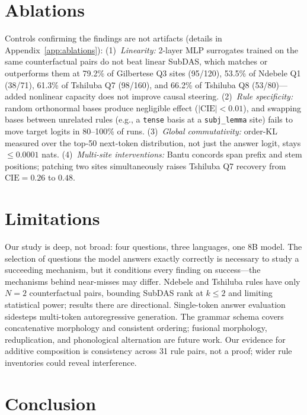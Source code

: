 \documentclass{article}
\begin{document}
\section{Ablations}
\label{sec:ablations}

Controls confirming the findings are not artifacts (details in
Appendix~\ref{app:ablations}): (1)~\emph{Linearity:} 2-layer MLP surrogates
trained on the same counterfactual pairs do not beat linear SubDAS, which
matches or outperforms them at 79.2\% of Gilbertese Q3 sites (95/120), 53.5\%
of Ndebele Q1 (38/71), 61.3\% of Tshiluba Q7 (98/160), and 66.2\% of Tshiluba
Q8 (53/80)---added nonlinear capacity does not improve causal steering.
(2)~\emph{Rule specificity:} random orthonormal bases produce negligible
effect ($|\mathrm{CIE}| < 0.01$), and swapping bases between unrelated rules
(e.g., a \texttt{tense} basis at a \texttt{subj\_lemma} site) fails to move
target logits in 80--100\% of runs. (3)~\emph{Global commutativity:} order-KL
measured over the top-50 next-token distribution, not just the answer logit,
stays $\le 0.0001$ nats. (4)~\emph{Multi-site interventions:} Bantu concords
span prefix and stem positions; patching two sites simultaneously raises
Tshiluba Q7 recovery from $\mathrm{CIE}=0.26$ to $0.48$.

\section{Limitations}
\label{sec:limitations}

Our study is deep, not broad: four questions, three languages, one 8B model.
The selection of questions the model answers exactly correctly is necessary to
study a succeeding mechanism, but it conditions every finding on success---the
mechanisms behind near-misses may differ. Ndebele and Tshiluba rules have only
$N=2$ counterfactual pairs, bounding SubDAS rank at $k\le2$ and limiting
statistical power; results there are directional. Single-token answer
evaluation sidesteps multi-token autoregressive generation. The grammar schema
covers concatenative morphology and consistent ordering; fusional morphology,
reduplication, and phonological alternation are future work. Our evidence for
additive composition is consistency across 31 rule pairs, not a proof; wider
rule inventories could reveal interference.

\section{Conclusion}
\label{sec:conclusion}
\end{document}
